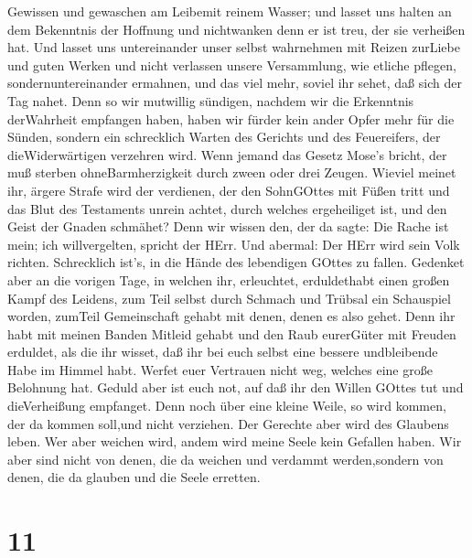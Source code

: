 Gewissen und gewaschen am Leibemit reinem Wasser;  und
lasset uns halten an dem Bekenntnis der Hoffnung und nichtwanken denn er
ist treu, der sie verheißen hat.  Und lasset uns
untereinander unser selbst wahrnehmen mit Reizen zurLiebe und guten
Werken  und nicht verlassen unsere Versammlung, wie etliche
pflegen, sondernuntereinander ermahnen, und das viel mehr, soviel ihr
sehet, daß sich der Tag nahet.  Denn so wir mutwillig
sündigen, nachdem wir die Erkenntnis derWahrheit empfangen haben, haben
wir fürder kein ander Opfer mehr für die Sünden,  sondern
ein schrecklich Warten des Gerichts und des Feuereifers, der
dieWiderwärtigen verzehren wird.  Wenn jemand das Gesetz
Mose's bricht, der muß sterben ohneBarmherzigkeit durch zween oder drei
Zeugen.  Wieviel meinet ihr, ärgere Strafe wird der
verdienen, der den SohnGOttes mit Füßen tritt und das Blut des
Testaments unrein achtet, durch welches ergeheiliget ist, und den Geist
der Gnaden schmähet?  Denn wir wissen den, der da sagte:
Die Rache ist mein; ich willvergelten, spricht der HErr. Und abermal:
Der HErr wird sein Volk richten.  Schrecklich ist's, in die
Hände des lebendigen GOttes zu fallen.  Gedenket aber an
die vorigen Tage, in welchen ihr, erleuchtet, erduldethabt einen großen
Kampf des Leidens,  zum Teil selbst durch Schmach und
Trübsal ein Schauspiel worden, zumTeil Gemeinschaft gehabt mit denen,
denen es also gehet.  Denn ihr habt mit meinen Banden
Mitleid gehabt und den Raub eurerGüter mit Freuden erduldet, als die ihr
wisset, daß ihr bei euch selbst eine bessere undbleibende Habe im Himmel
habt.  Werfet euer Vertrauen nicht weg, welches eine große
Belohnung hat.  Geduld aber ist euch not, auf daß ihr den
Willen GOttes tut und dieVerheißung empfanget.  Denn noch
über eine kleine Weile, so wird kommen, der da kommen soll,und nicht
verziehen.  Der Gerechte aber wird des Glaubens leben. Wer
aber weichen wird, andem wird meine Seele kein Gefallen haben.
 Wir aber sind nicht von denen, die da weichen und verdammt
werden,sondern von denen, die da glauben und die Seele erretten.

\hypertarget{section-9}{%
\section{11}\label{section-9}}


